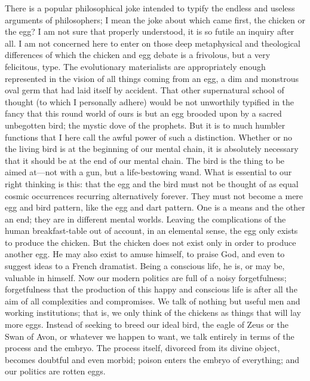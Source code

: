 \documentclass{book}
\begin{document}
There is a popular philosophical joke intended to typify the endless and useless arguments of philosophers; I mean the joke about which came first, the chicken or the egg? I am not sure that properly understood, it is so futile an inquiry after all. I am not concerned here to enter on those deep metaphysical and theological differences of which the chicken and egg debate is a frivolous, but a very felicitous, type. The evolutionary materialists are appropriately enough represented in the vision of all things coming from an egg, a dim and monstrous oval germ that had laid itself by accident. That other supernatural school of thought (to which I personally adhere) would be not unworthily typified in the fancy that this round world of ours is but an egg brooded upon by a sacred unbegotten bird; the mystic dove of the prophets. But it is to much humbler functions that I here call the awful power of such a distinction. Whether or no the living bird is at the beginning of our mental chain, it is absolutely necessary that it should be at the end of our mental chain. The bird is the thing to be aimed at—not with a gun, but a life-bestowing wand. What is essential to our right thinking is this: that the egg and the bird must not be thought of as equal cosmic occurrences recurring alternatively forever. They must not become a mere egg and bird pattern, like the egg and dart pattern. One is a means and the other an end; they are in different mental worlds. Leaving the complications of the human breakfast-table out of account, in an elemental sense, the egg only exists to produce the chicken. But the chicken does not exist only in order to produce another egg. He may also exist to amuse himself, to praise God, and even to suggest ideas to a French dramatist. Being a conscious life, he is, or may be, valuable in himself. Now our modern politics are full of a noisy forgetfulness; forgetfulness that the production of this happy and conscious life is after all the aim of all complexities and compromises. We talk of nothing but useful men and working institutions; that is, we only think of the chickens as things that will lay more eggs. Instead of seeking to breed our ideal bird, the eagle of Zeus or the Swan of Avon, or whatever we happen to want, we talk entirely in terms of the process and the embryo. The process itself, divorced from its divine object, becomes doubtful and even morbid; poison enters the embryo of everything; and our politics are rotten eggs.
\end{document}
